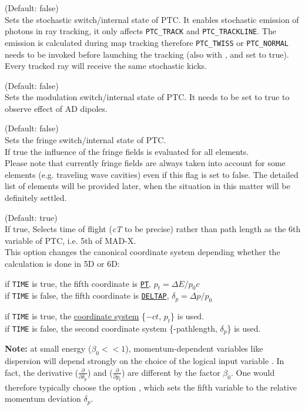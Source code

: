 \begin{madlist}
	 (Default: false)\\    
	Sets the stochastic switch/internal state of PTC. 
	It enables stochastic emission of photons in ray tracking,  
                    it only affects \texttt{PTC\_TRACK} and \texttt{PTC\_TRACKLINE}.
	The emission is calculated during map tracking therefore 
	\texttt{PTC\_TWISS} or \texttt{PTC\_NORMAL} 
	needs to be invoked before launching the tracking 
	(also with ,  and  set to true). 
	Every tracked ray will receive the same stochastic kicks.

	 (Default: false)\\    
	Sets the modulation switch/internal state of PTC. 
	It needs to be set to true to observe effect of AD dipoles.
	
	 (Default: false)\\    
	Sets the fringe switch/internal state of PTC. \\ 
	If true the influence of the fringe fields is evaluated for all
	elements. \\       
	Please note that currently fringe fields are always taken into
	account for some elements (e.g. traveling wave cavities) even if
	this flag is set to false. The detailed list of elements
	will be provided later, when the situation in this matter will be
	definitely settled.    
	
	 (Default: true)\\  
	If true, Selects time of flight (\textit{cT} to be precise) rather
	than path length as the 6th variable of PTC, i.e. 5th of MAD-X. \\
                    This option changes the canonical coordinate system depending
	whether the calculation is done in 5D or 6D: 
	 \begin{madlist}
	    if \texttt{TIME} is true, the fifth coordinate is
	   \hyperref[subsec:tables-canon]{\texttt{PT}},
	   $p_t = \Delta E / p_0 c$ \\  
	   if \texttt{TIME} is false, the fifth coordinate is
	   \hyperref[subsec:tables-canon]{\texttt{DELTAP}},
	   $\delta_p = \Delta p / p_0$

	    if \texttt{TIME} is true, the
	   \hyperref[subsec:tables-canon]{\madx coordinate system}
	   \{$-ct$, $p_t$\} is used. \\    
	   if \texttt{TIME} is false, the second \ptc coordinate system
	   \{-pathlength, $\delta_p$\} is used. 
	 \end{madlist}

	\textbf{Note:} at small energy ($\beta_0 << 1$),
	momentum-dependent variables like dispersion will depend  strongly on
	the choice of  the logical input variable .  In fact, the
	derivative ($\frac{\partial}{\partial \delta_p}$)  and
	($\frac{\partial}{\partial p_t}$)  are different by the
	factor $\beta_0$. One would  therefore typically  choose
	the option ,  which sets the fifth variable to
	the relative momentum deviation $\delta_p$.

	
\end{madlist}

